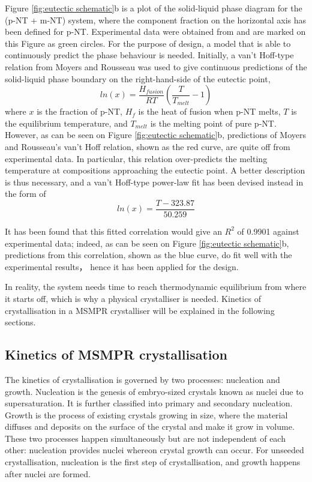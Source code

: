 Figure \ref{fig:eutectic schematic}b is a plot of the solid-liquid phase diagram for the (p-NT + m-NT) system, where the component fraction on the horizontal axis has been defined for p-NT. Experimental data were obtained from \cite{detherm} and are marked on this Figure as green circles. For the purpose of design, a model that is able to continuously predict the phase behaviour is needed. Initially, a van't Hoff-type relation from Moyers and Rousseau was used to give continuous predictions of the solid-liquid phase boundary on the right-hand-side of the eutectic point, \cite{Moyers and Rousseau}
\begin{equation}
    ln(x) = \frac{H_{fusion}}{R T}(\frac{T}{T_{melt}} - 1)
\end{equation}
where $x$ is the fraction of p-NT, $H_f$ is the heat of fusion when p-NT melts, $T$ is the equilibrium temperature, and $T_{melt}$ is the melting point of pure p-NT. However, as can be seen on Figure \ref{fig:eutectic schematic}b, predictions of Moyers and Rousseau's van't Hoff relation, shown as the red curve, are quite off from experimental data. In particular, this relation over-predicts the melting temperature at compositions approaching the eutectic point. A better description is thus necessary, and a van't Hoff-type power-law fit has been devised instead in the form of 
\begin{equation}
     ln(x) = \frac{T - 323.87}{50.259}
\end{equation}

It has been found that this fitted correlation would give an $R^2$ of 0.9901 against experimental data; indeed, as can be seen on Figure \ref{fig:eutectic schematic}b, predictions from this correlation, shown as the blue curve, do fit well with the experimental results， hence it has been applied for the design.

In reality, the system needs time to reach thermodynamic equilibrium from where it starts off, which is why a physical crystalliser is needed. Kinetics of crystallisation in a MSMPR crystalliser will be explained in the following sections.

\subsection{Kinetics of MSMPR crystallisation}
The kinetics of crystallisation is governed by two processes: nucleation and growth. Nucleation is the genesis of embryo-sized crystals known as nuclei due to supersaturation. \cite{richardson} It is further classified into primary and secondary nucleation. Growth is the process of existing crystals growing in size, where the material diffuses and deposits on the surface of the crystal and make it grow in volume. These two processes happen simultaneously but are not independent of each other: nucleation provides nuclei whereon crystal growth can occur. For unseeded crystallisation, nucleation is the first step of crystallisation, and growth happens after nuclei are formed. 

